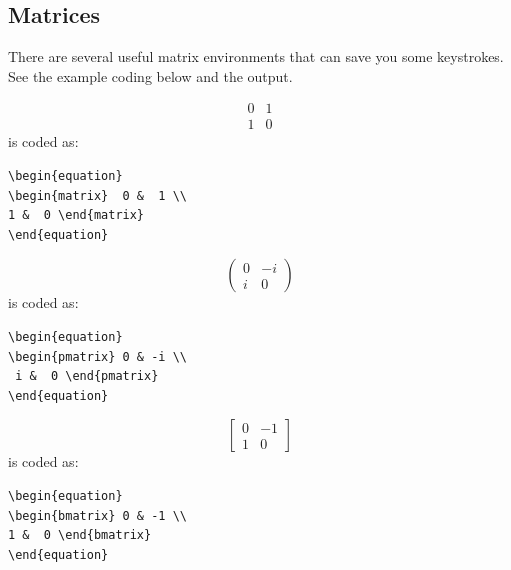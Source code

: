 \documentclass[]{IEEEtran}
\begin{document}
\subsection{Matrices}
There are several useful matrix environments that can save you some keystrokes. See the example coding below and the output.

\begin{equation}
	\begin{matrix}  0 & 1 \\
                1 & 0\end{matrix}
\end{equation}
is coded as:
\begin{verbatim}
\begin{equation}
\begin{matrix}  0 &  1 \\ 
1 &  0 \end{matrix}
\end{equation}
\end{verbatim}

\begin{equation}
	\begin{pmatrix} 0 & -i \\
                i & 0\end{pmatrix}
\end{equation}
is coded as:
\begin{verbatim}
\begin{equation}
\begin{pmatrix} 0 & -i \\
 i &  0 \end{pmatrix}
\end{equation}
\end{verbatim}

\begin{equation}
	\begin{bmatrix} 0 & -1 \\
                1 & 0\end{bmatrix}
\end{equation}
is coded as:
\begin{verbatim}
\begin{equation}
\begin{bmatrix} 0 & -1 \\ 
1 &  0 \end{bmatrix}
\end{equation}
\end{verbatim}
\end{document}
